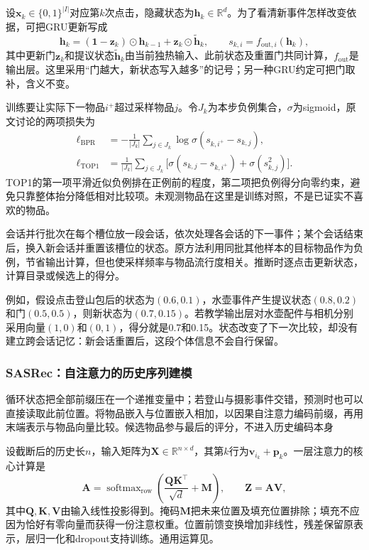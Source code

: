 设$\bm{x}_k\in\{0,1\}^{|I|}$对应第$k$次点击，隐藏状态为$\bm{h}_k\in\mathbb{R}^d$。为了看清新事件怎样改变依据，可把GRU更新写成
\begin{equation}
  \bm{h}_k=(\bm{1}-\bm{z}_k)\odot\bm{h}_{k-1}
       +\bm{z}_k\odot\widetilde{\bm{h}}_k,\qquad
  s_{k,i}=f_{\mathrm{out},i}(\bm{h}_k),
  \label{eq:rs-gru4rec-state}
\end{equation}
其中更新门$\bm{z}_k$和提议状态$\widetilde{\bm{h}}_k$由当前独热输入、此前状态及重置门共同计算，$f_{\mathrm{out}}$是输出层。这里采用“门越大，新状态写入越多”的记号；另一种GRU约定可把门取补，含义不变。

训练要让实际下一物品$i^+$超过采样物品$j$。令$J_k$为本步负例集合，$\sigma$为sigmoid，原文讨论的两项损失为
\begin{align}
  \ell_{\mathrm{BPR}}
    &=-\frac{1}{|J_k|}\sum_{j\in J_k}\log\sigma(s_{k,i^+}-s_{k,j}),\\
  \ell_{\mathrm{TOP1}}
    &=\frac{1}{|J_k|}\sum_{j\in J_k}
       \bigl[\sigma(s_{k,j}-s_{k,i^+})+\sigma(s_{k,j}^2)\bigr].
  \label{eq:rs-gru4rec-top1}
\end{align}
TOP1的第一项平滑近似负例排在正例前的程度，第二项把负例得分向零约束，避免只靠整体抬分降低相对比较项。未观测物品在这里是训练对照，不是已证实不喜欢的物品。

会话并行批次在每个槽位放一段会话，依次处理各会话的下一事件；某个会话结束后，换入新会话并重置该槽位的状态。原方法利用同批其他样本的目标物品作为负例，节省输出计算，但也使采样频率与物品流行度相关。推断时逐点击更新状态，计算目录或候选上的得分。

例如，假设点击登山包后的状态为$(0.6,0.1)$，水壶事件产生提议状态$(0.8,0.2)$和门$(0.5,0.5)$，则新状态为$(0.7,0.15)$。若教学输出层对水壶配件与相机分别采用向量$(1,0)$和$(0,1)$，得分就是0.7和0.15。状态改变了下一次比较，却没有建立跨会话记忆：新会话重置后，这段个体信息不会自行保留。

\subsubsection{SASRec：自注意力的历史序列建模}
\label{sec:rs-sasrec}

循环状态把全部前缀压在一个递推变量中；若登山与摄影事件交错，预测时也可以直接读取此前位置。将物品嵌入与位置嵌入相加，以因果自注意力编码前缀，再用末端表示与物品向量比较。候选物品参与最后的评分，不进入历史编码本身

设截断后的历史长$n$，输入矩阵为$\bm{X}\in\mathbb{R}^{n\times d}$，其第$k$行为$\bm{v}_{i_k}+\bm{p}_k$。一层注意力的核心计算是
\begin{equation}
  \bm{A}=\operatorname{softmax}_{\mathrm{row}}
  \left(\frac{\bm{Q}\bm{K}^{\top}}{\sqrt d}+\bm{M}\right),
  \qquad \bm{Z}=\bm{A}\bm{V},
  \label{eq:rs-sasrec-attention}
\end{equation}
其中$\bm{Q},\bm{K},\bm{V}$由输入线性投影得到。掩码$\bm{M}$把未来位置及填充位置排除；填充不应因为恰好有零向量而获得一份注意权重。位置前馈变换增加非线性，残差保留原表示，层归一化和dropout支持训练。通用运算见。

